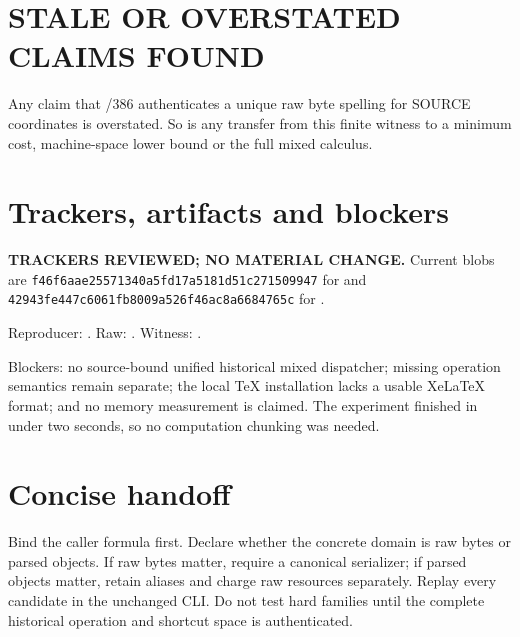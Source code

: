 \documentclass[11pt]{article}
\begin{document}
\section{STALE OR OVERSTATED CLAIMS FOUND}
Any claim that /386 authenticates a unique raw byte spelling for SOURCE
coordinates is overstated.  So is any transfer from this finite witness to a
minimum cost, machine-space lower bound or the full mixed calculus.

\section{Trackers, artifacts and blockers}
\textbf{TRACKERS REVIEWED; NO MATERIAL CHANGE.}  Current blobs are
\texttt{f46f6aae25571340a5fd17a5181d51c271509947} for
 and
\texttt{42943fe447c6061fb8009a526f46ac8a6684765c} for
.

Reproducer:
.
Raw:
.
Witness:
.

Blockers: no source-bound unified historical mixed dispatcher; missing
operation semantics remain separate; the local TeX installation lacks a
usable XeLaTeX format; and no memory measurement is claimed.  The experiment
finished in under two seconds, so no computation chunking was needed.

\section*{Concise handoff}
Bind the caller formula first.  Declare whether the concrete domain is raw
bytes or parsed objects.  If raw bytes matter, require a canonical serializer;
if parsed objects matter, retain aliases and charge raw resources separately.
Replay every candidate in the unchanged CLI.  Do not test hard families until
the complete historical operation and shortcut space is authenticated.

\end{document}
